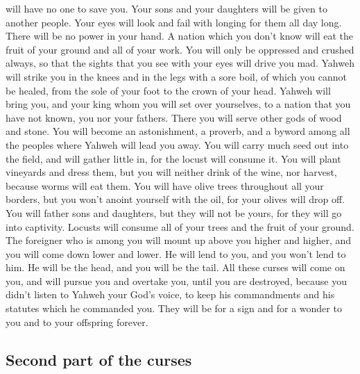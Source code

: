 will have no one to save you.  Your sons and your
daughters will be given to another people. Your eyes will look and fail
with longing for them all day long. There will be no power in your hand.
 A nation which you don't know will eat the fruit of your
ground and all of your work. You will only be oppressed and crushed
always,  so that the sights that you see with your eyes
will drive you mad.  Yahweh will strike you in the knees
and in the legs with a sore boil, of which you cannot be healed, from
the sole of your foot to the crown of your head.  Yahweh
will bring you, and your king whom you will set over yourselves, to a
nation that you have not known, you nor your fathers. There you will
serve other gods of wood and stone.  You will become an
astonishment, a proverb, and a byword among all the peoples where Yahweh
will lead you away.  You will carry much seed out into
the field, and will gather little in, for the locust will consume it.
 You will plant vineyards and dress them, but you will
neither drink of the wine, nor harvest, because worms will eat them.
 You will have olive trees throughout all your borders,
but you won't anoint yourself with the oil, for your olives will drop
off.  You will father sons and daughters, but they will
not be yours, for they will go into captivity.  Locusts
will consume all of your trees and the fruit of your ground.
 The foreigner who is among you will mount up above you
higher and higher, and you will come down lower and lower.
 He will lend to you, and you won't lend to him. He will
be the head, and you will be the tail.  All these curses
will come on you, and will pursue you and overtake you, until you are
destroyed, because you didn't listen to Yahweh your God's voice, to keep
his commandments and his statutes which he commanded you.
 They will be for a sign and for a wonder to you and to
your offspring forever.

\hypertarget{second-part-of-the-curses}{%
\subsection{Second part of the curses}\label{second-part-of-the-curses}}

